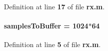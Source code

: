 Definition at line {\bf 17} of file {\bf rx.\+m}.

\paragraph[{samples\+To\+Buffer}]{\setlength{\rightskip}{0pt plus 5cm}samples\+To\+Buffer = 1024$\ast$64}\label{rx_8m_aef62e6be40f7ee3ec37d427c7e59b2a8}


Definition at line {\bf 5} of file {\bf rx.\+m}.

